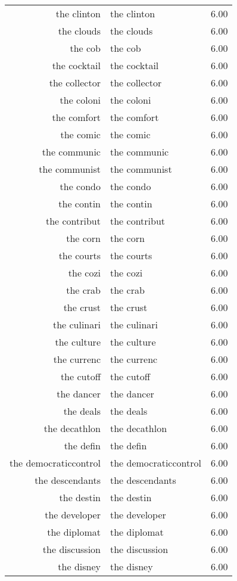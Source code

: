 \begin{table}[ht]
\begin{tabular}{rlr}
  the clinton & the clinton & 6.00 \\ 
  the clouds & the clouds & 6.00 \\ 
  the cob & the cob & 6.00 \\ 
  the cocktail & the cocktail & 6.00 \\ 
  the collector & the collector & 6.00 \\ 
  the coloni & the coloni & 6.00 \\ 
  the comfort & the comfort & 6.00 \\ 
  the comic & the comic & 6.00 \\ 
  the communic & the communic & 6.00 \\ 
  the communist & the communist & 6.00 \\ 
  the condo & the condo & 6.00 \\ 
  the contin & the contin & 6.00 \\ 
  the contribut & the contribut & 6.00 \\ 
  the corn & the corn & 6.00 \\ 
  the courts & the courts & 6.00 \\ 
  the cozi & the cozi & 6.00 \\ 
  the crab & the crab & 6.00 \\ 
  the crust & the crust & 6.00 \\ 
  the culinari & the culinari & 6.00 \\ 
  the culture & the culture & 6.00 \\ 
  the currenc & the currenc & 6.00 \\ 
  the cutoff & the cutoff & 6.00 \\ 
  the dancer & the dancer & 6.00 \\ 
  the deals & the deals & 6.00 \\ 
  the decathlon & the decathlon & 6.00 \\ 
  the defin & the defin & 6.00 \\ 
  the democraticcontrol & the democraticcontrol & 6.00 \\ 
  the descendants & the descendants & 6.00 \\ 
  the destin & the destin & 6.00 \\ 
  the developer & the developer & 6.00 \\ 
  the diplomat & the diplomat & 6.00 \\ 
  the discussion & the discussion & 6.00 \\ 
  the disney & the disney & 6.00 \\ 

\end{tabular}
\end{table}

